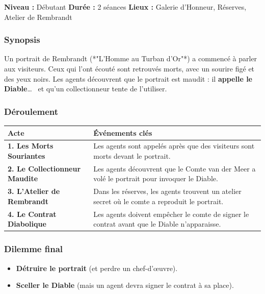 \documentclass[10pt,a5paper,twoside]{book}
\begin{document}
\begin{shaded}
	\textbf{Niveau :} Débutant \quad
	\textbf{Durée :} 2 séances \quad
	\textbf{Lieux :} Galerie d'Honneur, Réserves, Atelier de Rembrandt
\end{shaded}

\subsubsection*{Synopsis}
Un portrait de Rembrandt (*"L'Homme au Turban d'Or"*) a commencé à parler aux visiteurs. Ceux qui l'ont écouté sont retrouvés morts, avec un sourire figé et des yeux noirs. Les agents découvrent que le portrait est maudit : il \textbf{appelle le Diable}\ldots~  et qu'un collectionneur tente de l'utiliser.

\subsubsection*{Déroulement}
\begin{center}
	\begin{tabular}{|P{3cm}|P{9cm}|}
	\hline
	\textbf{Acte} 							& \textbf{Événements clés} \\ \hline
	\textbf{1. Les Morts Souriantes} 		& Les agents sont appelés après que des visiteurs sont morts devant le portrait. \\ \hline
	\textbf{2. Le Collectionneur Maudite} 	& Les agents découvrent que le Comte van der Meer a volé le portrait pour invoquer le Diable. \\ \hline
	\textbf{3. L'Atelier de Rembrandt} 		& Dans les réserves, les agents trouvent un atelier secret où le comte a reproduit le portrait. \\ \hline
	\textbf{4. Le Contrat Diabolique} 		& Les agents doivent empêcher le comte de signer le contrat avant que le Diable n'apparaisse. \\ \hline
	\end{tabular}
\end{center}

\subsubsection*{Dilemme final}

\begin{itemize}
	\item \textbf{Détruire le portrait} (et perdre un chef-d'œuvre).
	\item \textbf{Sceller le Diable} (mais un agent devra signer le contrat à sa place).
\end{itemize}
\end{document}
